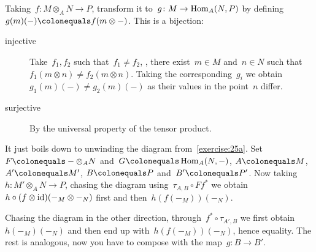 \begin{exercise}
  Taking~$f\colon M\otimes_A N\to P$, transform it to~$g\colon M\to\operatorname{Hom}_A(N,P)$ by defining~$g(m)(-)\colonequals f(m\otimes-)$. This is a bijection:
  \begin{description}
    \item[injective] Take~$f_1,f_2$ such that~$f_1\neq f_2$, \ie, there exist~$m\in M$ and~$n\in N$ such that~$f_1(m\otimes n)\neq f_2(m\otimes n)$. Taking the corresponding~$g_i$ we obtain~$g_1(m)(-)\neq g_2(m)(-)$ as their values in the point~$n$ differ.

    \item[surjective] By the universal property of the tensor product.
  \end{description}
\end{exercise}

\begin{exercise}
  \label{exercise:25d}
  It just boils down to unwinding the diagram from~\autoref{exercise:25a}. Set~$F\colonequals-\otimes_A N$ and~$G\colonequals\Hom_A(N,-)$, $A\colonequals M$, $A'\colonequals M'$, $B\colonequals P$ and~$B'\colonequals P'$. Now taking~$h\colon M'\otimes_A N\to P$, chasing the diagram using~$\tau_{A,B}\circ Ff^*$ we obtain~$h\circ (f\otimes\mathrm{id})(-_M\otimes-_N)$ first and then~$h(f(-_M))(-_N)$.

  Chasing the diagram in the other direction, through~$f^*\circ\tau_{A',B}$ we first obtain~$h(-_M)(-_N)$ and then end up with~$h(f(-_M))(-_N)$, hence equality. The rest is analogous, now you have to compose with the map~$g\colon B\to B'$.
\end{exercise}

